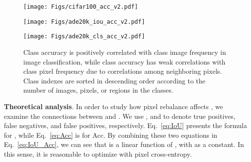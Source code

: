 \documentclass[final]{cvpr}
\begin{document}
\begin{figure*}[t]
	\begin{center}
		\begin{minipage}[t]{0.32\textwidth} 
			\begin{center}
				\texttt{[image: Figs/cifar100\_acc\_v2.pdf]} 
				\label{fig:cifar100_acc} 
			\end{center} 
		\end{minipage} 
		\hspace{0.05in}
		\begin{minipage}[t]{0.32\textwidth} 
			\begin{center}
				\texttt{[image: Figs/ade20k\_iou\_acc\_v2.pdf]} 
				\label{fig:ade20k_pixel_acc} 
			\end{center}
		\end{minipage}
		\hspace{0.05in}
		\begin{minipage}[t]{0.32\textwidth} 
			\begin{center}
				\texttt{[image: Figs/ade20k\_cls\_acc\_v2.pdf]} 
				\label{fig:ade20k_img_acc} 
			\end{center}
		\end{minipage}
	\end{center}
	\vspace{-0.20in}
	\caption{Class accuracy is positively correlated with class image frequency in image classification, while class accuracy has weak correlations with class pixel frequency due to correlations among neighboring pixels. Class indexes are sorted in descending order according to the number of images, pixels, or regions in the classes.}
	\label{fig:accs_cifar100_ade20k}
\end{figure*}

\vspace{1mm}
\noindent\textbf{Theoretical analysis}.
In order to study how pixel rebalance affects ,
we examine the connections between  and . We
use ,  and  to denote true positives, false negatives, and false positives, respectively. Eq.~\eqref{eq:IoU} presents the formula for , while Eq.~\eqref{eq:Acc} is for Acc. By combining these two equations in Eq.~\eqref{eq:IoU_Acc}, we can see that  is a linear function of , with  as a constant. In this sense, it is reasonable to optimize  with pixel cross-entropy.
\end{document}
